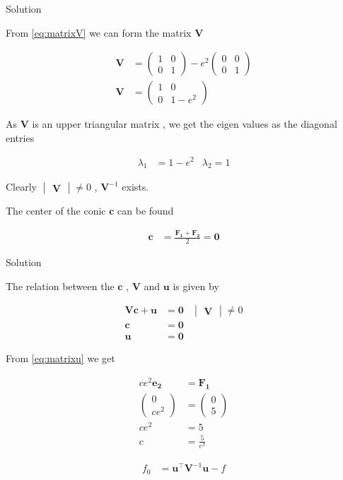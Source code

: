\documentclass{beamer}
\numberwithin{equation}{section}
\theoremstyle{remark}
\newcommand{\myvec}[1]{\ensuremath{\begin{pmatrix}#1\end{pmatrix}}}
\newcommand{\mydet}[1]{\ensuremath{\begin{vmatrix}#1\end{vmatrix}}}
\let\vec\mathbf
\begin{document}
\begin{frame}{Solution}

From \eqref{eq:matrixV} we can form the matrix $\vec{V}$

\begin{align}
  \vec{V} &= \myvec{1 & 0\\0 & 1} - e^2\myvec{0 & 0\\0 & 1}\\
  \vec{V} &= \myvec{1 & 0\\0 & 1 - e^2}
\end{align}

As $\vec{V}$ is an upper triangular matrix , we get the eigen values as the diagonal entries 

\begin{align}
  \lambda_1 &= 1 - e^2 & \lambda_2 = 1
\end{align}

Clearly $\mydet{\vec{V}} \neq 0$ , $\vec{V}^{-1}$ exists.

The center of the conic $\vec{c}$ can be found 

\begin{align}
  \vec{c} &= \frac{\vec{F_1}+\vec{F_2}}{2} = \vec{0}
\end{align}

\end{frame}

\begin{frame}{Solution}

The relation between the $\vec{c}$ , $\vec{V}$ and $\vec{u}$ is given by 

\begin{align}
  \vec{V}\vec{c} + \vec{u} &= \vec{0} & \mydet{\vec{V}} \neq 0 \\
  \vec{c} &= \vec{0}\\
  \vec{u} &= \vec{0}
\end{align}

From \eqref{eq:matrixu} we get 

\begin{align}
  ce^2\vec{e_2} &= \vec{F_1}\\
  \myvec{0\\ce^2} &= \myvec{0\\5}\\
  ce^2 &= 5\\
  c &= \frac{5}{e^2} \label{eq:c}
\end{align}

\begin{align}
  f_0 &= \vec{u}^\top\vec{V}^{-1}\vec{u} - f
\end{align}

\end{frame}
\end{document}
